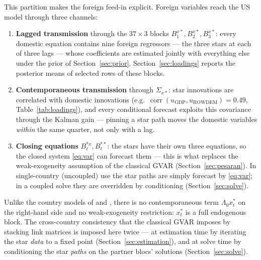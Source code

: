 \documentclass[11pt]{article}
\begin{document}
This partition makes the foreign feed-in explicit. Foreign variables reach the US model through
three channels:
\begin{enumerate}[leftmargin=1.6em, itemsep=2pt]
  \item \textbf{Lagged transmission} through the $37\times3$ blocks
        $B^{x*}_1, B^{x*}_2, B^{x*}_3$: every domestic equation contains nine foreign regressors
        --- the three stars at each of three lags --- whose coefficients are estimated jointly
        with everything else under the prior of Section~\ref{sec:prior}. Section~\ref{sec:loadings}
        reports the posterior means of selected rows of these blocks.
  \item \textbf{Contemporaneous transmission} through $\Sigma_{x*}$: star innovations are
        correlated with domestic innovations (e.g.\
        $\operatorname{corr}(u_{\mathrm{GDP}},u_{\mathrm{ROWDEM}})=0.49$,
        Table~\ref{tab:loadings}), and every conditional forecast exploits this covariance through
        the Kalman gain --- pinning a star path moves the domestic variables \emph{within} the
        same quarter, not only with a lag.
  \item \textbf{Closing equations} $B^{*x}_\ell, B^{**}_\ell$: the stars have their own three
        equations, so the closed system \eqref{eq:var} can forecast them --- this is what replaces
        the weak-exogeneity assumption of the classical GVAR
        (Section~\ref{sec:pesaran}). In single-country (uncoupled) use the star paths are simply
        forecast by \eqref{eq:var}; in a coupled solve they are overridden by conditioning
        (Section~\ref{sec:solve}).
\end{enumerate}

Unlike the country models of \citet{PesaranSchuermannWeiner2004} and
\citet{DeesDiMauroPesaranSmith2007}, there is no contemporaneous term $\Lambda_0 x^{*}_t$ on the
right-hand side and no weak-exogeneity restriction: $x^*_t$ is a full endogenous block. The
cross-country consistency that the classical GVAR imposes by stacking link matrices is imposed
here twice --- at estimation time by iterating the star \emph{data} to a fixed point
(Section~\ref{sec:estimation}), and at solve time by conditioning the star \emph{paths} on the
partner blocs' solutions (Section~\ref{sec:solve}).
\end{document}
